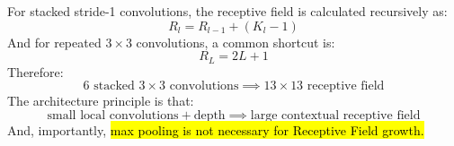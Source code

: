 \begin{takeawaysbox}
    For stacked stride-1 convolutions, the receptive field is calculated recursively as:
    \begin{equation*}
        R_l=R_{l-1}+(K_l-1)
    \end{equation*}
    And for repeated $3\times3$ convolutions, a common shortcut is:
    \begin{equation*}
        R_L=2L+1
    \end{equation*}
    Therefore:
    \begin{equation*}
        \text{6 stacked } 3\times3 \text{ convolutions} \implies 13 \times 13 \text{ receptive field}
    \end{equation*}
    The architecture principle is that:
    \begin{equation*}
        \text{small local convolutions} + \text{depth} \implies \text{large contextual receptive field}
    \end{equation*}
    And, importantly, \hl{max pooling is not necessary for Receptive Field growth.}
\end{takeawaysbox}
